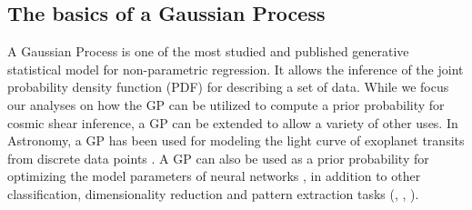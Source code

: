 \subsection{The basics of a Gaussian Process}
A Gaussian Process is one of the most studied and published 
generative statistical model for non-parametric regression. 
It allows the inference of the joint probability density 
function (PDF) for describing a set of data. 
While we focus our analyses on how the GP can be utilized to compute a prior
probability for cosmic shear inference, a GP can be extended to 
allow a variety of other uses. In Astronomy, a GP has been used for modeling 
the light curve of exoplanet transits from discrete data points \citep{Ambikasaran2014a}.
A GP can also be used as a prior probability for optimizing the model parameters of
neural networks \citep{Snoek2012}, in addition to 
other classification, dimensionality reduction 
and pattern extraction tasks
(\citealt{Wilson2013}, \citealt{Duvenaud2013}, \citealt{Rasmussen2006}).
 
